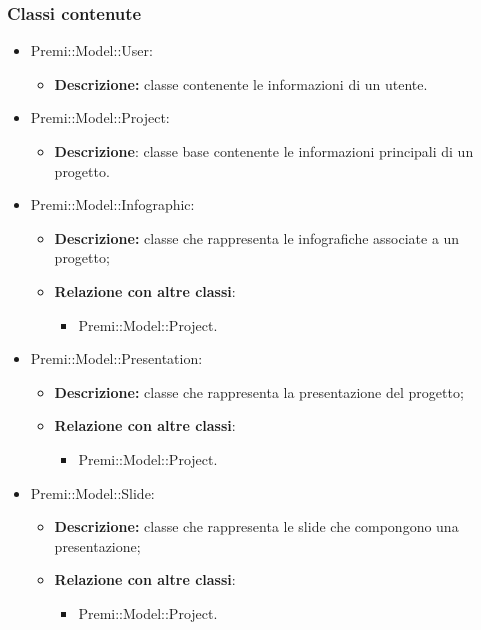 	\subsubsection*{Classi contenute}
	\begin{itemize}
		\item Premi::Model::User:
		\begin{itemize}
			\item \textbf{Descrizione:} classe contenente le informazioni di un utente.
		\end{itemize}
		\item Premi::Model::Project:
		\begin{itemize}
			\item \textbf{Descrizione}: classe base contenente le informazioni principali di un progetto.
		\end{itemize}
			
		\item Premi::Model::Infographic:
		\begin{itemize}
			\item \textbf{Descrizione:} classe che rappresenta le infografiche associate a un progetto;
			\item \textbf{Relazione con altre classi}:
			\begin{itemize}
				\item Premi::Model::Project.
			\end{itemize}
		\end{itemize}
		
		\item Premi::Model::Presentation:
		\begin{itemize}
			\item \textbf{Descrizione:} classe che rappresenta la presentazione del progetto;
			\item \textbf{Relazione con altre classi}:
			\begin{itemize}
				\item Premi::Model::Project.
			\end{itemize}
		\end{itemize}
		
		\item Premi::Model::Slide:
		\begin{itemize}
			\item \textbf{Descrizione:} classe che rappresenta le \gls{slide} che compongono una presentazione;
			\item \textbf{Relazione con altre classi}:
			\begin{itemize}
				\item Premi::Model::Project.
			\end{itemize}
		\end{itemize}
		

\end{itemize}
